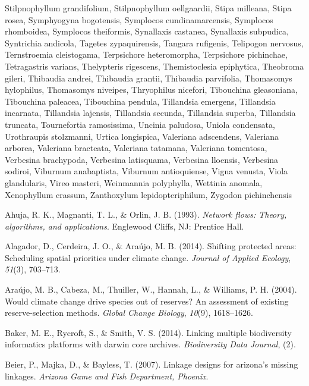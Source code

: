 \documentclass[]{article}
\begin{document}
Stilpnophyllum grandifolium, Stilpnophyllum oellgaardii, Stipa milleana, Stipa rosea, Symphyogyna bogotensis, Symplocos cundinamarcensis, Symplocos rhomboidea, Symplocos theiformis, Synallaxis castanea, Synallaxis subpudica, Syntrichia andicola, Tagetes zypaquirensis, Tangara rufigenis, Telipogon nervosus, Ternstroemia cleistogama, Terpsichore heteromorpha, Terpsichore pichinchae, Tetragastris varians, Thelypteris rigescens, Themistoclesia epiphytica, Theobroma gileri, Thibaudia andrei, Thibaudia grantii, Thibaudia parvifolia, Thomasomys hylophilus, Thomasomys niveipes, Thryophilus nicefori, Tibouchina gleasoniana, Tibouchina paleacea, Tibouchina pendula, Tillandsia emergens, Tillandsia incarnata, Tillandsia lajensis, Tillandsia secunda, Tillandsia superba, Tillandsia truncata, Tournefortia ramosissima, Uncinia paludosa, Uniola condensata, Urothraupis stolzmanni, Urtica longispica, Valeriana adscendens, Valeriana arborea, Valeriana bracteata, Valeriana tatamana, Valeriana tomentosa, Verbesina brachypoda, Verbesina latisquama, Verbesina lloensis, Verbesina sodiroi, Viburnum anabaptista, Viburnum antioquiense, Vigna venusta, Viola glandularis, Vireo masteri, Weinmannia polyphylla, Wettinia anomala, Xenophyllum crassum, Zanthoxylum lepidopteriphilum, Zygodon pichinchensis

\hypertarget{refs}{}
\leavevmode\hypertarget{ref-Ahuja93}{}%
Ahuja, R. K., Magnanti, T. L., \& Orlin, J. B. (1993). \emph{Network flows: Theory, algorithms, and applications}. Englewood Cliffs, NJ: Prentice Hall.

\leavevmode\hypertarget{ref-alagador2014shifting}{}%
Alagador, D., Cerdeira, J. O., \& Araújo, M. B. (2014). Shifting protected areas: Scheduling spatial priorities under climate change. \emph{Journal of Applied Ecology}, \emph{51}(3), 703--713.

\leavevmode\hypertarget{ref-araujo2004would}{}%
Araújo, M. B., Cabeza, M., Thuiller, W., Hannah, L., \& Williams, P. H. (2004). Would climate change drive species out of reserves? An assessment of existing reserve-selection methods. \emph{Global Change Biology}, \emph{10}(9), 1618--1626.

\leavevmode\hypertarget{ref-baker2014linking}{}%
Baker, M. E., Rycroft, S., \& Smith, V. S. (2014). Linking multiple biodiversity informatics platforms with darwin core archives. \emph{Biodiversity Data Journal}, (2).

\leavevmode\hypertarget{ref-beier2007linkage}{}%
Beier, P., Majka, D., \& Bayless, T. (2007). Linkage designs for arizona's missing linkages. \emph{Arizona Game and Fish Department, Phoenix}.
\end{document}
